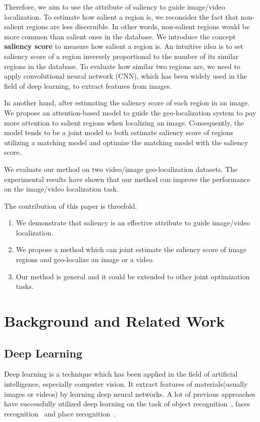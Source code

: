 \par
Therefore, we aim to use the attribute of saliency to guide image/video localization. To estimate how salient a region is, we reconsider the fact that non-salient regions are less discernible. In other words, non-salient regions would be more common than salient ones in the database. We introduce the concept \textbf{saliency score} to measure how salient a region is. An intuitive idea is to set saliency score of a region inversely proportional to the number of its similar regions in the database. To evaluate how similar two regions are, we need to apply convolutional neural network (CNN), which has been widely used in the field of deep learning, to extract features from images. 
\par
In another hand, after estimating the saliency score of each region in an image. We propose an attention-based model to guide the geo-localization system to pay more attention to salient regions when localizing an image. Consequently, the model tends to be a joint model to both estimate saliency score of regions utilizing a matching model and optimize the matching model with the saliency score. 
\par
We evaluate our method on two video/image geo-localization datasets. The experimental results have shown that our method can improve the performance on the image/video localization task.
\par
The contribution of this paper is threefold. 
\begin{enumerate}
\item We demonstrate that saliency is an effective attribute to guide image/video localization. 
\item We propose a method which can joint estimate the saliency score of image regions and geo-localize an image or a video.
\item Our method is general and it could be extended to other joint optimization tasks. 
\end{enumerate}



\section{Background and Related Work}
\subsection{Deep Learning}
\par
Deep learning is a technique which has been applied in the field of artificial intelligence, especially computer vision. It extract features of materials(usually images or videos) by learning deep neural networks. A lot of previous approaches have successfully utilized deep learning on the task of object recognition~\cite{krizhevsky2012imagenet}, faces recognition~\cite{taigman2014deepface} and place recognition~\cite{zhou2014learning,lin2015learning,Arandjelovic16,workman2015wide,weyand2016planet}. 
